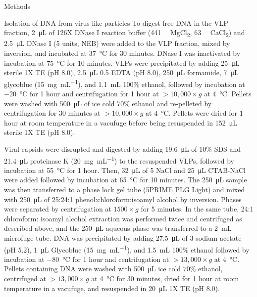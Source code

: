 \documentclass[oneside,12pt,final]{sty/ucthesis-CA2012}
\begin{document}
\begin{mainmatter}
\begin{section}{Methods}
\begin{subsection}{Isolation of DNA from virus-like particles}
To digest free DNA in the VLP fraction, \SI{2}{\micro\liter} of 126X DNase I reaction buffer (\SI{441}{\milli\molar} MgCl\textsubscript{2}, \SI{63}{\milli\molar} CaCl\textsubscript{2}) and \SI{2.5}{\micro\liter} DNase I (5 units, NEB) were added to the VLP fraction, mixed by inversion, and incubated at \SI{37}{\celsius} for 30 minutes. DNase I was inactivated by incubation at \SI{75}{\celsius} for 10 minutes. VLPs were precipitated by adding \SI{25}{\micro\liter} sterile 1X TE (pH 8.0), \SI{2.5}{\micro\liter} \SI{0.5}{\molar} EDTA (pH 8.0), \SI{250}{\micro\liter} formamide, \SI{7}{\micro\liter} glycoblue (\SI{15}{\milli\gram\per\mL}), and \SI{1.1}{\mL} 100\% ethanol, followed by incubation at \SI{-20}{\celsius} for 1 hour and centrifugation for 1 hour at $> 10,000 \times g$ at \SI{4}{\celsius}. Pellets were washed with \SI{500}{\micro\liter} of ice cold 70\% ethanol and re-pelleted by centrifugation for 30 minutes at $> 10,000 \times g$ at \SI{4}{\celsius}. Pellets were dried for 1 hour at room temperature in a vacufuge before being resuspended in \SI{152}{\micro\liter} sterile 1X TE (pH 8.0).

Viral capsids were disrupted and digested by adding \SI{19.6}{\micro\liter} of 10\% SDS and \SI{21.4}{\micro\liter} proteinase K (\SI{20}{\milli\gram\per\mL}) to the resuspended VLPs, followed by incubation at \SI{55}{\celsius} for 1 hour. Then, \SI{32}{\micro\liter} of \SI{5}{\molar} NaCl and \SI{25}{\micro\liter} CTAB-NaCl were added followed by incubation at \SI{65}{\celsius} for 10 minutes. The \SI{250}{\micro\liter} sample was then transferred to a phase lock gel tube (5PRIME PLG Light) and mixed with \SI{250}{\micro\liter} of 25:24:1 phenol:chloroform:isoamyl alcohol by inversion. Phases were separated by centrifugation at $1500 \times g$ for 5 minutes. In the same tube, 24:1 chloroform: isoamyl alcohol extraction was performed twice and centrifuged as described above, and the \SI{250}{\micro\liter} aqueous phase was transferred to a \SI{2}{\mL} microfuge tube. DNA was precipitated by adding \SI{27.5}{\micro\liter} of \SI{3}{\molar} sodium acetate (pH 5.2), \SI{1}{\micro\liter} Glycoblue (\SI{15}{\milli\gram\per\mL}), and \SI{1.5}{\mL} 100\% ethanol followed by incubation at \SI{-80}{\celsius} for 1 hour and centrifugation at $> 13,000 \times g$ at \SI{4}{\celsius}. Pellets containing DNA were washed with \SI{500}{\micro\liter} ice cold 70\% ethanol, centrifuged at $> 13,000 \times g$ at \SI{4}{\celsius} for 30 minutes, dried for 1 hour at room temperature in a vacufuge, and resuspended in \SI{20}{\micro\liter} 1X TE (pH 8.0).
\end{subsection}


\end{section}
\end{mainmatter}
\end{document}
